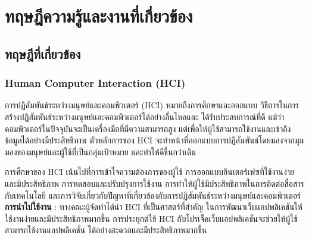 \chapter{ทฤษฎีความรู้และงานที่เกี่ยวข้อง}



\section{ทฤษฎีที่เกี่ยวข้อง}
\subsection{Human Computer Interaction (HCI)}
การปฏิสัมพันธ์ระหว่างมนุษย์และคอมพิวเตอร์ (HCI) หมายถึงการศึกษาและออกแบบ
วิธีการในการสร้างปฏิสัมพันธ์ระหว่างมนุษย์และคอมพิวเตอร์ได้อย่างลื่นไหลและ
ได้รับประสบการณ์ที่ดี แม้ว่าคอมพิวเตอร์ในปัจจุบันจะเป็นเครื่องมือที่มีความสามารถสูง 
แต่เพื่อให้ผู้ใช้สามารถใช้งานและเข้าถึงข้อมูลได้อย่างมีประสิทธิภาพ ตัวหลักการของ HCI 
จะทำหน้าที่ออกแบบการปฏิสัมพันธ์โดยมองจากมุมมองของมนุษย์และผู้ใช้ที่เป็นกลุ่มเป้าหมาย 
และทำให้ดีขึ้นกว่าเดิม
\par การศึกษาของ HCI เน้นไปที่การเข้าใจความต้องการของผู้ใช้ 
การออกแบบอินเตอร์เฟซที่ใช้งานง่ายและมีประสิทธิภาพ การทดสอบและปรับปรุงการใช้งาน 
การทำให้ผู้ใช้มีประสิทธิภาพในการติดต่อสื่อสารกับเทคโนโลยี 
และการวิจัยเกี่ยวกับปัญหาที่เกี่ยวข้องกับการปฏิสัมพันธ์ระหว่างมนุษย์และคอมพิวเตอร์ \\
\textbf{การนำไปใช้งาน} : ทางคณะผู้จัดทำได้นำ HCI ที่เป็นศาสตร์ที่สำคัญ
ในการพัฒนาเว็บแอปพลิเคชันให้ใช้งานง่ายและมีประสิทธิภาพมากขึ้น 
การประยุกต์ใช้ HCI กับโปรเจ็คเว็บแอปพลิเคชันจะช่วยให้ผู้ใช้สามารถใช้งานแอปพลิเคชั่น
ได้อย่างสะดวกและมีประสิทธิภาพมากขึ้น
